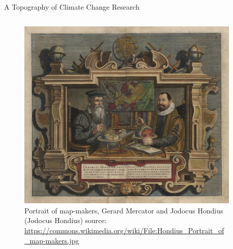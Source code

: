 \documentclass[9pt]{beamer}
\begin{document}
\begin{frame}{A Topography of Climate Change Research}
\begin{columns}
	\begin{column}{0.5\linewidth}
		\begin{center}
			\begin{figure}
				\includegraphics[width=1\linewidth]{../plots/Hondius_Portrait_of_map-makers}
				\caption{Portrait of map-makers, Gerard Mercator and Jodocus Hondius (Jodocus Hondius) source: \url{https://commons.wikimedia.org/wiki/File:Hondius_Portrait_of_map-makers.jpg}}
			\end{figure}
		\end{center}
	\end{column}
	\begin{column}{0.5\linewidth}
		\begin{center}

\end{center}
\end{column}
\end{columns}
\end{frame}
\end{document}
